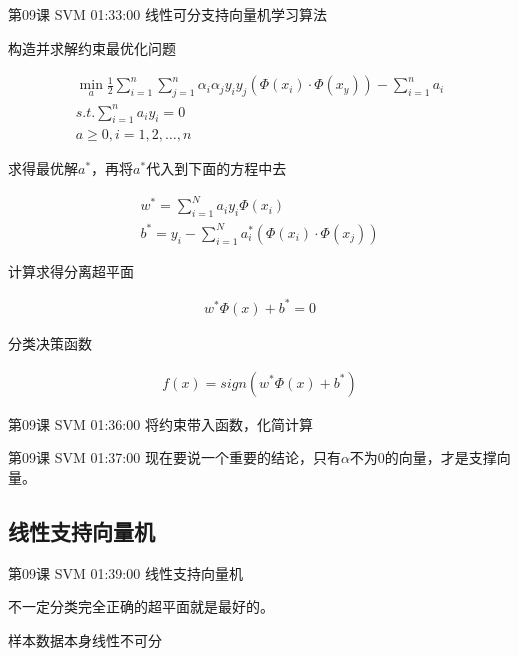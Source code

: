 \documentclass[UTF8]{ctexart}
\begin{document}
第09课 SVM 01:33:00 线性可分支持向量机学习算法

构造并求解约束最优化问题

\begin{equation}
\begin{aligned}
\underset{a}{\min} \frac{1}{2} \sum_{i=1}^{n} \sum_{j=1}^{n} \alpha_{i} \alpha_{j} y_{i} y_{j} \left ( \Phi(x_{i}) \cdot  \Phi(x_{y}) \right ) - \sum_{i=1}^{n} a_{i} \\
s.t. \sum_{i=1}^{n} a_{i}y_{i}=0 \\
a \geq 0, i=1,2,\dots , n
\end{aligned}
\end{equation}

求得最优解$a^{*}$，再将$a^{*}$代入到下面的方程中去

\begin{equation}
\begin{aligned}
w^{*}=\sum_{i=1}^{N}a_{i}y_{i}\Phi (x_{i}) \\
b^{*}=y_{i}-\sum_{i=1}^{N}a_{i}^{*} \left ( \Phi(x_{i}) \cdot \Phi(x_{j}) \right )
\end{aligned}
\end{equation}

计算求得分离超平面

\begin{equation}
\begin{aligned}
w^{*}\Phi(x)+b^{*}=0
\end{aligned}
\end{equation}

分类决策函数

\begin{equation}
\begin{aligned}
f(x)=sign \left ( w^{*}\Phi(x)+b^{*} \right )
\end{aligned}
\end{equation}

第09课 SVM 01:36:00 将约束带入函数，化简计算

第09课 SVM 01:37:00 现在要说一个重要的结论，只有$\alpha$不为0的向量，才是支撑向量。

\subsection{线性支持向量机}

第09课 SVM 01:39:00 线性支持向量机

不一定分类完全正确的超平面就是最好的。

样本数据本身线性不可分
\end{document}
